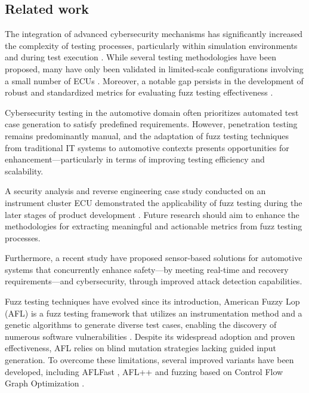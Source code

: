 \documentclass[a4paper, fleqn]{cas-dc}
\begin{document}
	\subsection{Related work}
	
	The integration of advanced cybersecurity mechanisms has significantly increased the complexity of testing processes, particularly within simulation environments and during test execution  \cite{marksteiner2021using}. While several testing methodologies have been proposed, many have only been validated in limited-scale configurations involving a small number of ECUs \cite{oruganti2019hardware}. Moreover, a notable gap persists in the development of robust and standardized metrics for evaluating fuzz testing effectiveness \cite{fowler2019method}.
	
	Cybersecurity testing in the automotive domain often prioritizes automated test case generation to satisfy predefined requirements. However, penetration testing remains predominantly manual, and the adaptation of fuzz testing techniques from traditional IT systems to automotive contexts presents opportunities for enhancement—particularly in terms of improving testing efficiency and scalability.
	
	A security analysis and reverse engineering case study conducted on an instrument cluster ECU demonstrated the applicability of fuzz testing during the later stages of product development \cite{anistoroaei2022security}. Future research should aim to enhance the methodologies for extracting meaningful and actionable metrics from fuzz testing processes.
	
	Furthermore, a recent study \cite{wang2020real} have proposed sensor-based solutions for automotive systems that concurrently enhance safety—by meeting real-time and recovery requirements—and cybersecurity, through improved attack detection capabilities. 
	
	Fuzz testing techniques have evolved since its introduction, American Fuzzy Lop (AFL) is a fuzz testing framework that utilizes an instrumentation method and a genetic algorithms to generate diverse test cases, enabling the discovery of numerous software vulnerabilities \cite{zalewski2017american}. Despite its widespread adoption and proven effectiveness, AFL relies on blind mutation strategies lacking guided input generation. To overcome these limitations, several improved variants have been developed, including AFLFast \cite{bohme2016coverage}, AFL++ \cite{fioraldi2020afl++} and fuzzing based on Control Flow Graph Optimization \cite{10662925}.
	
\end{document}
